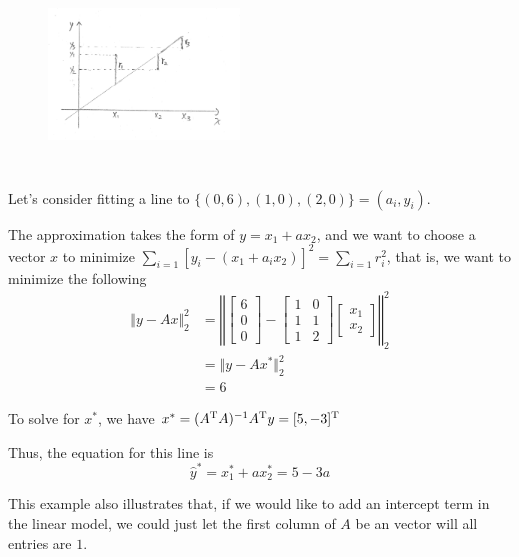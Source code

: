 \begin{figure}
	\centering
	\includegraphics[width=2in,height=2in]{figures/ch06/ch06-02.jpg}
\end{figure}


\begin{example}

Let's consider fitting a line to $\{(0,6),(1,0),(2,0) \}={(a_i,y_i)}.$

The approximation takes the form of $y=x_1+ax_2$, and we want to choose a vector $x$ to minimize $\sum_{i=1}[y_i-(x_1+a_ix_2)]^2 = \sum_{i=1} r_i^2$, that is, we want to minimize the following
\begin{align*}
\Vert y- Ax\Vert_2^2 
&=
\left\Vert
\begin{bmatrix}
6\\
0\\
0
\end{bmatrix}
-
\begin{bmatrix}
1&0\\
1&1\\
1&2
\end{bmatrix}
\begin{bmatrix}
x_1\\
x_2
\end{bmatrix}
\right\Vert_2^2\\
&=\Vert y-Ax^*\Vert^2_2\\
&=6
\end{align*}

To solve for $x^*$, we have
$x^*=(A^{{\rm T}}A)^{-1}A^{{\rm T}}y=[5 , -3]^{{\rm T}}$

Thus, the equation for this line is
$$\hat{y}^*=x_1^*+ax_2^*=5-3a$$            %

This example also illustrates that, if we would like to add an intercept term in the linear model, we could just let the first column of $A$ be an vector will all entries are $1$.
\end{example}


